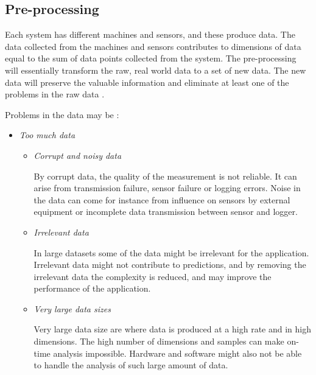 \documentclass[english, a4paper]{report}
\begin{document}
{{        \subsection{Pre-processing} \label{pre-processing-theory}
        {
            Each system has different machines and sensors, and these produce data. The data collected from the machines and sensors contributes to dimensions of data equal to the sum of data points collected from the system. The pre-processing will essentially transform the raw, real world data to a set of new data. The new data will preserve the valuable information and eliminate at least one of the problems in the raw data \cite{dataPreprocessing}. 
            \par
            Problems in the data may be \cite{dataPreprocessing}:
            
            \begin{itemize}
                \item \textit{Too much data}
                \begin{itemize}
                    \item \textit{Corrupt and noisy data}
                    \par
                    By corrupt data, the quality of the measurement is not reliable. It can arise from transmission failure, sensor failure or logging errors. Noise in the data can come for instance from influence on sensors by external equipment or incomplete data transmission between sensor and logger.
                    
                    \item \textit{Irrelevant data}
                    \par
                    In large datasets some of the data might be irrelevant for the application. Irrelevant data might not contribute to predictions, and by removing the irrelevant data the complexity is reduced, and may improve the performance of the application.
                    \item \textit{Very large data sizes}
                    \par
                    Very large data size are where data is produced at a high rate and in high dimensions. The high number of dimensions and samples can make on-time analysis impossible. Hardware and software might also not be able to handle the analysis of such large amount of data.
                    
                \end{itemize}
                

\end{itemize}}}}
\end{document}
